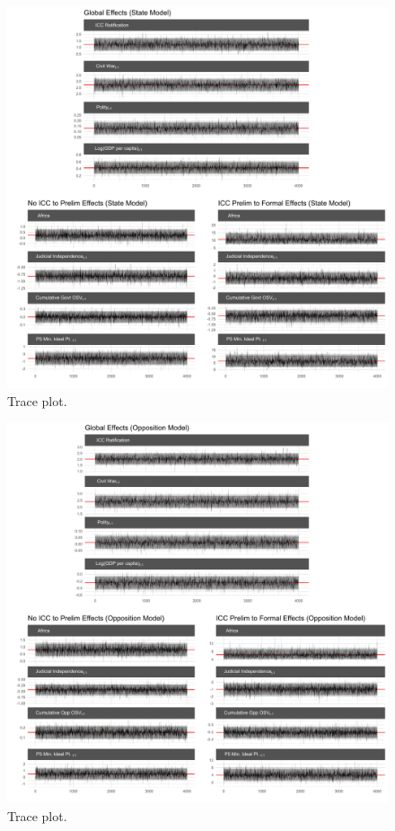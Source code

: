 \begin{figure}
    \centering
    \includegraphics[width=1\textwidth]{stateCoefTrace.pdf}
    \caption{Trace plot.}
    \label{fig:stateTrace}
\end{figure}
\FloatBarrier

\begin{figure}
    \centering
    \includegraphics[width=1\textwidth]{rebelCoefTrace.pdf}
    \caption{Trace plot.}
    \label{fig:oppTrace}
\end{figure}
\FloatBarrier

